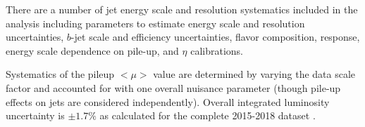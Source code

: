There are a number of jet energy scale and resolution systematics included in the analysis including parameters to estimate energy scale and resolution uncertainties, $b$-jet scale and efficiency uncertainties, flavor composition, response, energy scale dependence on pile-up, and $\eta$ calibrations.

Systematics of the pileup $<\mu>$ value are determined by varying the data scale factor and accounted for with one overall nuisance parameter (though pile-up effects on jets are considered independently). Overall integrated luminosity uncertainty is $\pm 1.7\%$ as calculated for the complete 2015-2018 dataset \cite{ATLAS-CONF-2019-021}.

\begin{table}
\end{table}
